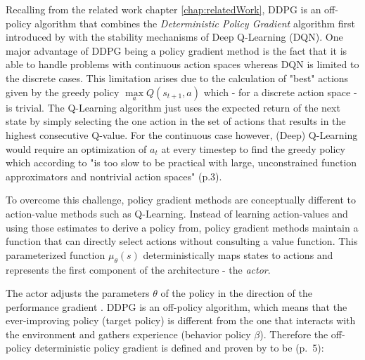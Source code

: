 Recalling from the related work chapter \ref{chap:relatedWork}, DDPG is an off-policy algorithm that combines the \textit{Deterministic Policy Gradient} algorithm first introduced by \cite{silver2014deterministic} with the stability mechanisms of Deep Q-Learning (DQN). One major advantage of DDPG being a policy gradient method is the fact that it is able to handle problems with continuous action spaces  \cite[p.3]{lillicrap2019continuous} whereas DQN is limited to the discrete cases. This limitation arises due to the calculation of "best" actions given by the greedy policy $\max\limits_{a} Q(s_{t+1},a)$ which - for a discrete action space - is trivial. The Q-Learning algorithm just uses the expected return of the next state by simply selecting the one action in the set of actions that results in the highest consecutive Q-value. For the continuous case however, (Deep) Q-Learning would require an optimization of $a_t$ at every timestep to find the greedy policy which according to \cite{lillicrap2019continuous} "is too slow to be practical with large, unconstrained function approximators and nontrivial action spaces" (p.3).
\par
To overcome this challenge, policy gradient methods are conceptually different to action-value methods such as Q-Learning. Instead of learning action-values and using those estimates to derive a policy from, policy gradient methods maintain a function that can directly select actions without consulting a value function. This parameterized function $\mu_\theta(s)$ deterministically maps states to actions \cite[p.3]{lillicrap2019continuous} and represents the first component of the architecture - the \textit{actor}.
\par 
The actor adjusts the parameters $\theta$ of the policy in the direction of the performance gradient \cite[p.~2]{silver2014deterministic}. DDPG is an off-policy algorithm, which means that the ever-improving policy (target policy) is different from the one that interacts with the environment and gathers experience (behavior policy $\beta$). Therefore the off-policy deterministic policy gradient is defined and proven by \cite{silver2014deterministic} to be (p.~5): 

